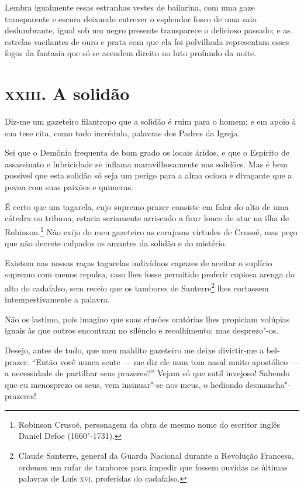 Lembra igualmente essas estranhas vestes de bailarina, com uma
gaze transparente e escura deixando entrever o esplendor fosco de
uma saia deslumbrante, igual sob um negro presente transparece o delicioso
passado; e as estrelas vacilantes de ouro e prata com que ela foi
polvilhada representam esses fogos da fantasia que só se acendem direito
no luto profundo da noite.

\chapter{\textsc{xxiii.} A solidão}

Diz-me um gazeteiro filantropo que a solidão é ruim para o homem; e em
apoio à sua tese cita, como todo incrédulo, palavras dos Padres
da Igreja.

Sei que o Demônio frequenta de bom grado os locais áridos, e que o
Espírito de assassinato e lubricidade se inflama maravilhosamente 
nas solidões. Mas é bem possível que esta solidão só seja um perigo
para a alma ociosa e divagante que a povoa com suas paixões e quimeras.

É certo que um tagarela, cujo supremo prazer consiste em falar do alto
de uma cátedra ou tribuna, estaria seriamente arriscado a
ficar louco de atar na ilha de Robinson.\footnote{ Robinson 
Crusoé, personagem da obra de mesmo nome do escritor inglês Daniel Defoe (1660"-1731).} Não exijo
do meu gazeteiro as corajosas virtudes de Crusoé, mas peço que não
decrete culpados os amantes da solidão e do mistério.

Existem nas nossas raças tagarelas indivíduos capazes de aceitar o suplício supremo com menos
repulsa, caso lhes fosse permitido proferir copiosa arenga do
alto do cadafalso, sem receio que os tambores de
Santerre\footnote{  Claude Santerre, general da Guarda Nacional durante a Revolução
Francesa, ordenou um rufar de tambores para impedir que fossem ouvidas
as últimas palavras de Luis \textsc{xvi}, proferidas do cadafalso.} lhes cortassem intempestivamente a palavra.

Não os lastimo, pois imagino que suas efusões oratórias lhes
propiciam volúpias iguais às que outros encontram no silêncio e
recolhimento; mas desprezo"-os.

Desejo, antes de tudo, que meu maldito gazeteiro me deixe divirtir-me a 
bel-prazer. “Então você nunca sente --- me diz ele num
tom nasal muito apostólico --- a necessidade
de partilhar seus
prazeres?'' Vejam só que sutil invejoso! Sabendo que eu
menosprezo os seus, vem insinuar"-se nos meus, o hediondo
desmancha"-prazeres!

